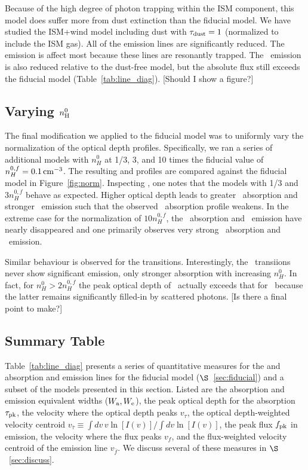 \documentclass[12pt,preprint]{aastex}
\begin{document}
Because of the high degree of photon trapping within the ISM
component, this model does suffer more from dust extinction than the
fiducial model.  We have studied the ISM+wind model including dust
with $\tau_{\rm dust}=1$ (normalized to include the ISM gas).  All of the 
emission lines are significantly reduced.  The  emission is
affect most because these lines are resonantly trapped.  The \feiis\
emission is also reduced relative to the dust-free model, but the
absolute flux still exceeds the fiducial model
(Table~\ref{tab:line_diag}).
[Should I show a figure?] 

\subsection{Varying $n_{\rm H}^0$}

The final modification we applied to the fiducial model was to
uniformly vary the normalization of the optical depth profiles.
Specifically, we ran a series of additional models with $n_H^0$ at
1/3, 3, and 10 times the fiducial value of $n_H^{0,f} = 0.1 \, {\rm cm^{-3}}$.
The resulting  and \ion{Fe}{2} profiles are compared
against the fiducial model in Figure~\ref{fig:norm}.  Inspecting
\ion{Mg}{2}, one notes that the models with 1/3 and $3 n_H^{0,f}$
behave as expected.  Higher optical depth leads to greater \mgiia\
absorption and stronger \mgiib\ emission such that the observed
\mgiib\ absorption profile weakens.  In the extreme case for the
normalization of $10 n_H^{0,f}$, the \mgiib\ absorption and \mgiia\
emission have nearly disappeared and one primarily observes very
strong \mgiia\ absorption and \mgiib\ emission.

Similar behaviour is observed for the \ion{Fe}{2} transitions.
Interestingly, the \feiia\ transiions never show significant emission,
only stronger absorption with increasing $n_H^0$.  In fact, for $n_H^0
> 2 n_H^{0,f}$ the peak optical depth of \feiia\ actually exceeds that
for \feiib\ because the latter remains significantly filled-in by
scattered photons.  [Is there a final point to make?]

\subsection{Summary Table}

Table~\ref{tab:line_diag} presents a series of quantitative measures
for the \ion{Mg}{2} and  absorption and emission lines for
the fiducial model ($\S$~\ref{sec:fiducial}) and a subset of the models
presented in this section.  Listed are the absorption and emission
equivalent widths ($W_{\rm a}, W_{\rm e}$), the peak optical depth
for the absorption $\tau_{\rm pk}$, the
velocity where the optical depth peaks $v_\tau$, the optical
depth-weighted velocity centroid $v_{\bar \tau} \equiv \int dv \, v
\ln[I(v)] / \int dv \ln[I(v)]$, the peak flux $f_{\rm pk}$ in
emission, the velocity where the flux peaks $v_f$, and the
flux-weighted velocity centroid of the emission line $v_{\bar f}$.
We discuss several of these measures in $\S$~\ref{sec:discuss}.
\end{document}
